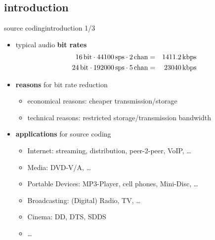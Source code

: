 \subsection{introduction}
	\begin{frame}{source coding}{introduction 1/3}
		\begin{itemize}
			\item	typical audio \textbf{bit rates}
				\begin{eqnarray}
					\unit[16]{bit}\cdot\unit[44100]{sps}\cdot\unit[2]{chan} &=& \unit[1411.2]{kbps}\nonumber\\
					\unit[24]{bit}\cdot\unit[192000]{sps}\cdot\unit[5]{chan} &=& \unit[23040]{kbps}\nonumber
				\end{eqnarray}
			\pause
			\vspace{-3mm}
			\item	\textbf{reasons} for bit rate reduction
				\begin{itemize}
					\item	economical reasons: cheaper transmission/storage
					\item	technical reasons: restricted storage/transmission bandwidth
				\end{itemize}
			\pause
			\item	\textbf{applications} for source coding
				\begin{itemize}
					\item	Internet: streaming, distribution, peer-2-peer, VoIP, \ldots
					\item	Media: DVD-V/A, \ldots
					\item	Portable Devices: MP3-Player, cell phones, Mini-Disc, \ldots
					\item	Broadcasting: (Digital) Radio, TV, \ldots
					\item	Cinema: DD, DTS, SDDS
					\item	\ldots
				\end{itemize}
		\end{itemize}
	\end{frame}
